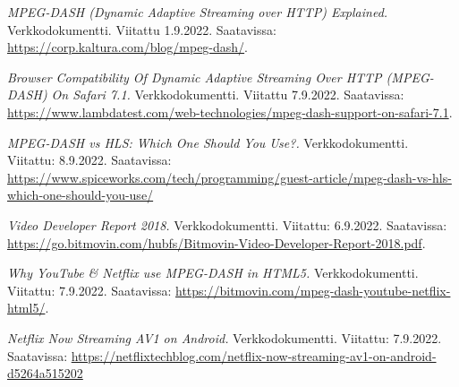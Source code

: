 \documentclass[finnish, 12pt, a4paper, elec, utf8, a-1b, online]{aaltothesis}
\begin{document}
\begin{thebibliography}{99}
    \textit{MPEG-DASH (Dynamic Adaptive Streaming over HTTP) Explained.}
    Verkkodokumentti.
    Viitattu 1.9.2022.
    Saatavissa: \url{https://corp.kaltura.com/blog/mpeg-dash/}.

    \textit{Browser Compatibility Of Dynamic Adaptive Streaming Over HTTP (MPEG-DASH) On Safari 7.1.}
    Verkkodokumentti.
    Viitattu 7.9.2022.
    Saatavissa: \url{https://www.lambdatest.com/web-technologies/mpeg-dash-support-on-safari-7.1}.

    \textit{MPEG-DASH vs HLS: Which One Should You Use?.}
    Verkkodokumentti.
    Viitattu: 8.9.2022.
    Saatavissa: \url{https://www.spiceworks.com/tech/programming/guest-article/mpeg-dash-vs-hls-which-one-should-you-use/}

    \textit{Video Developer Report 2018.}
    Verkkodokumentti.
    Viitattu: 6.9.2022.
    Saatavissa: \url{https://go.bitmovin.com/hubfs/Bitmovin-Video-Developer-Report-2018.pdf}.

    \textit{Why YouTube & Netflix use MPEG-DASH in HTML5.}
    Verkkodokumentti.
    Viitattu: 7.9.2022.
    Saatavissa: \url{https://bitmovin.com/mpeg-dash-youtube-netflix-html5/}.

    \textit{Netflix Now Streaming AV1 on Android.}
    Verkkodokumentti.
    Viitattu: 7.9.2022.
    Saatavissa: \url{https://netflixtechblog.com/netflix-now-streaming-av1-on-android-d5264a515202}

\end{thebibliography}
\end{document}
